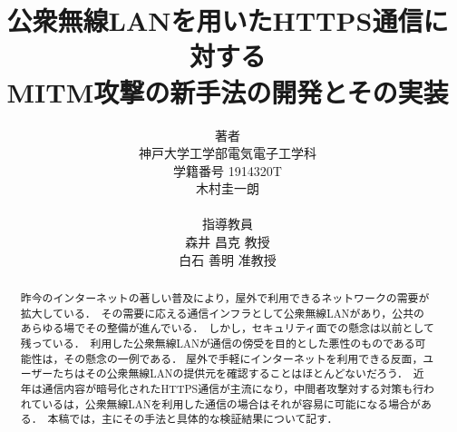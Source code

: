 \documentclass[dvipdfmx]{jsarticle}
\title{公衆無線LANを用いたHTTPS通信に対する\\MITM攻撃の新手法の開発とその実装}
\author{
    著者\\
    神戸大学工学部電気電子工学科\\
    学籍番号 1914320T\\
    木村圭一朗\\
    \\
    指導教員\\
    森井 昌克 教授\\
    白石 善明 准教授\\
}
\begin{document}
    \maketitle
    \begin{abstract}
        昨今のインターネットの著しい普及により，屋外で利用できるネットワークの需要が拡大している．\
        その需要に応える通信インフラとして公衆無線LANがあり，公共のあらゆる場でその整備が進んでいる．\
        しかし，セキュリティ面での懸念は以前として残っている．\
        利用した公衆無線LANが通信の傍受を目的とした悪性のものである可能性は，その懸念の一例である．
        屋外で手軽にインターネットを利用できる反面，ユーザーたちはその公衆無線LANの提供元を確認することはほとんどないだろう．\
        近年は通信内容が暗号化されたHTTPS通信が主流になり，中間者攻撃対する対策も行われているは，公衆無線LANを利用した通信の場合はそれが容易に可能になる場合がある．\
        本稿では，主にその手法と具体的な検証結果について記す．
        \newline
    \end{abstract}
    \tableofcontents
    \clearpage
\end{document}
